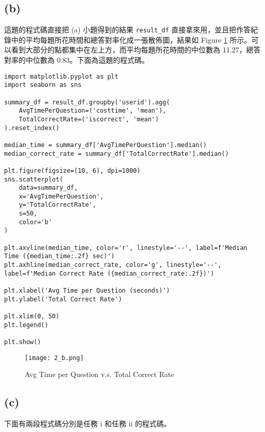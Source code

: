 \documentclass{article}
\begin{document}
\subsection*{(b)}
這題的程式碼直接把 (a) 小題得到的結果 \texttt{result\_df} 直接拿來用，並且把作答紀錄中的平均每題所花時間和總答對率化成一張散佈圖，結果如 Figure \ref{fig:2_b_image} 所示。可以看到大部分的點都集中在左上方，而平均每題所花時間的中位數為 11.27，總答對率的中位數為 0.83。下面為這題的程式碼。
\begin{verbatim}
import matplotlib.pyplot as plt
import seaborn as sns

summary_df = result_df.groupby('userid').agg(
    AvgTimePerQuestion=('costtime', 'mean'),
    TotalCorrectRate=('iscorrect', 'mean')
).reset_index()

median_time = summary_df['AvgTimePerQuestion'].median()
median_correct_rate = summary_df['TotalCorrectRate'].median()

plt.figure(figsize=(10, 6), dpi=1000)
sns.scatterplot(
    data=summary_df, 
    x='AvgTimePerQuestion', 
    y='TotalCorrectRate', 
    s=50, 
    color='b'
)

plt.axvline(median_time, color='r', linestyle='--', label=f'Median Time ({median_time:.2f} sec)')
plt.axhline(median_correct_rate, color='g', linestyle='--', label=f'Median Correct Rate ({median_correct_rate:.2f})')

plt.xlabel('Avg Time per Question (seconds)')
plt.ylabel('Total Correct Rate')

plt.xlim(0, 50)
plt.legend()

plt.show()
\end{verbatim}
\begin{figure}[H]
    \centering  %
    \texttt{[image: 2\_b.png]}  %
    \caption{Avg Time per Question v.s. Total Correct Rate}  %
    \label{fig:2_b_image}  %
\end{figure}


\subsection*{(c)}
下面有兩段程式碼分別是任務 i 和任務 ii 的程式碼。\\
\end{document}
